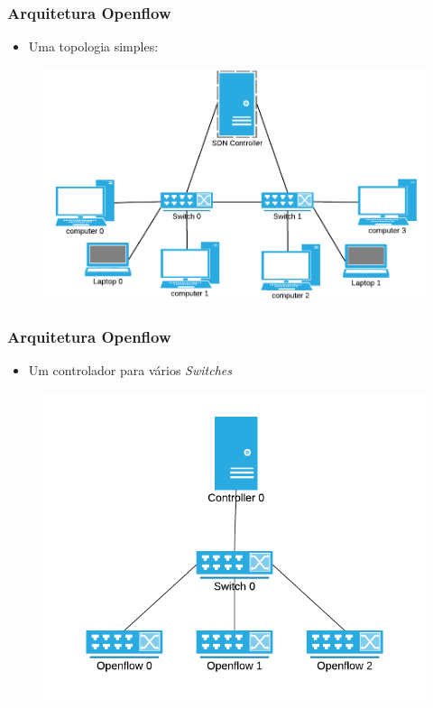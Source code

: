 %
%
\begin{frame}\frametitle{Arquitetura Openflow}

    \begin{itemize}
    \item Uma topologia simples:
    \end{itemize}
    
	\begin{figure}[h]
        \centering
        \includegraphics[scale=0.3]{images/simple-topology.png}
    \end{figure}
\end{frame}


%
%
\begin{frame}\frametitle{Arquitetura Openflow}

    \begin{itemize}
    \item Um controlador para vários \emph{Switches}
    \end{itemize}
    
	\begin{figure}[h]
        \centering
        \includegraphics[scale=0.4]{images/n-openflow-switches.png}
    \end{figure}
\end{frame}


